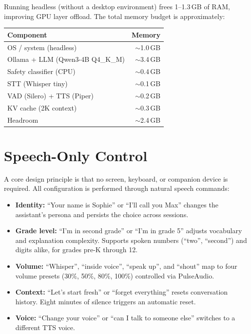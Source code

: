 \documentclass[11pt]{article}
\begin{document}
\noindent Running headless (without a desktop environment) frees 1--1.3\,GB of RAM, improving GPU layer offload. The total memory budget is approximately:

\begin{table}[h]
\centering
\begin{tabular}{lr}
\toprule
Component & Memory \\
\midrule
OS / system (headless) & $\sim$1.0\,GB \\
Ollama + LLM (Qwen3-4B Q4\_K\_M) & $\sim$3.4\,GB \\
Safety classifier (CPU) & $\sim$0.4\,GB \\
STT (Whisper tiny) & $\sim$0.1\,GB \\
VAD (Silero) + TTS (Piper) & $\sim$0.2\,GB \\
KV cache (2K context) & $\sim$0.3\,GB \\
\midrule
Headroom & $\sim$2.4\,GB \\
\bottomrule
\end{tabular}
\end{table}

\section{Speech-Only Control}

A core design principle is that no screen, keyboard, or companion device is required. All configuration is performed through natural speech commands:

\begin{itemize}[nosep]
  \item \textbf{Identity:} ``Your name is Sophie'' or ``I'll call you Max'' changes the assistant's persona and persists the choice across sessions.
  \item \textbf{Grade level:} ``I'm in second grade'' or ``I'm in grade 5'' adjusts vocabulary and explanation complexity. Supports spoken numbers (``two'', ``second'') and digits alike, for grades pre-K through 12.
  \item \textbf{Volume:} ``Whisper'', ``inside voice'', ``speak up'', and ``shout'' map to four volume presets (30\%, 50\%, 80\%, 100\%) controlled via PulseAudio.
  \item \textbf{Context:} ``Let's start fresh'' or ``forget everything'' resets conversation history. Eight minutes of silence triggers an automatic reset.
  \item \textbf{Voice:} ``Change your voice'' or ``can I talk to someone else'' switches to a different TTS voice.
\end{itemize}
\end{document}
